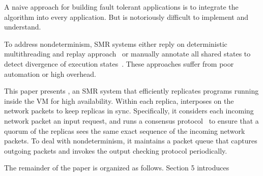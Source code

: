 A naive approach for building fault tolerant applications is to integrate the \paxos algorithm 
into every application. But \paxos is notoriously difficult to implement and understand.

To address nondeterminism, SMR systems either reply on deterministic multithreading and replay 
approach~\cite{rex:eurosys14} or manually annotate all shared states to detect divergence of execution 
states~\cite{eve:osdi12}. These approaches suffer from poor automation or high overhead.


This paper presents \xxx, an SMR system that efficiently replicates programs running inside the 
VM for high availability. Within each replica, \xxx interposes on the network packets to keep 
replicas in sync. Specifically, it considers each incoming network packet an input request, and runs 
a \paxos consensus protocol~\cite{paxos:practical} to ensure that a quorum of the replicas sees the 
same exact sequence of the incoming network packets. To deal with nondeterminism, it maintains a 
packet queue that captures outgoing packets and invokes the output checking protocol periodically.

The remainder of the paper is organized as follows. Section 5 introduces 
